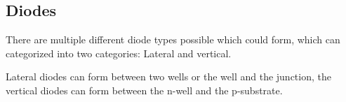 \subsection{Diodes}
There are multiple different diode types possible which could form, which can categorized into two categories: Lateral and vertical.

Lateral diodes can form between two wells or the well and the junction, the vertical diodes can form between the n-well and the p-substrate.